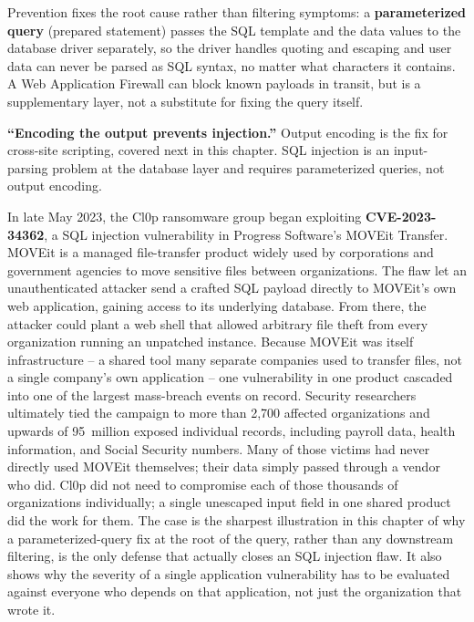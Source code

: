 Prevention fixes the root cause rather than filtering symptoms: a \textbf{parameterized query}
(prepared statement) passes the SQL template and the data values to the database driver separately,
so the driver handles quoting and escaping and user data can never be parsed as SQL syntax, no
matter what characters it contains. A Web Application Firewall can block known payloads in transit,
but is a supplementary layer, not a substitute for fixing the query itself.

\begin{misconception}
\textbf{``Encoding the output prevents injection.''} Output encoding is the fix for cross-site
scripting, covered next in this chapter. SQL injection is an input-parsing problem at the database
layer and requires parameterized queries, not output encoding.
\end{misconception}

\begin{example}
In late May 2023, the Cl0p ransomware group began exploiting \textbf{CVE-2023-34362}, a SQL
injection vulnerability in Progress Software's MOVEit Transfer. MOVEit is a managed file-transfer
product widely used by corporations and government agencies to move sensitive files between
organizations. The flaw let an unauthenticated attacker send a crafted SQL payload directly to
MOVEit's own web application, gaining access to its underlying database. From there, the attacker
could plant a web shell that allowed arbitrary file theft from every organization running an
unpatched instance. Because MOVEit was itself infrastructure -- a shared tool many
separate companies used to transfer files, not a single company's own application -- one
vulnerability in one product cascaded into one of the largest mass-breach events on record.
Security researchers ultimately tied the campaign to more than 2{,}700 affected organizations and
upwards of 95~million exposed individual records, including payroll data, health information, and
Social Security numbers. Many of those victims had never directly used MOVEit
themselves; their data simply passed through a vendor who did. Cl0p did not need to compromise
each of those thousands of organizations individually; a single unescaped input field in one
shared product did the work for them. The case is the sharpest illustration in this chapter of why
a parameterized-query fix at the root of the query, rather than any downstream filtering, is the
only defense that actually closes an SQL injection flaw. It also shows why the severity of a
single application vulnerability has to be evaluated against everyone who depends on that
application, not just the organization that wrote it.
\end{example}

